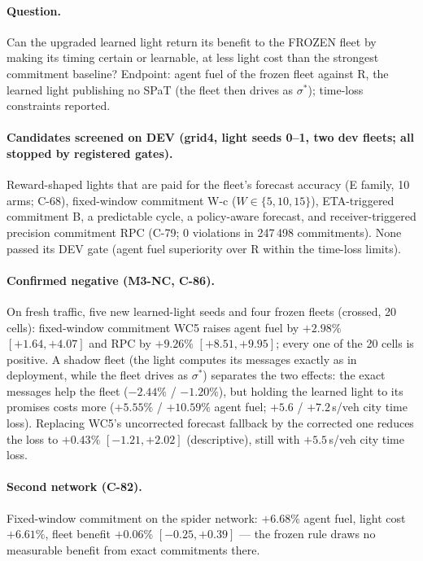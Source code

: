 \documentclass[11pt]{article}
\begin{document}
\paragraph{Question.} Can the upgraded learned light return its benefit to the FROZEN fleet by making its timing certain or learnable, at
less light cost than the strongest commitment baseline? Endpoint: agent fuel of the frozen fleet against R, the learned light publishing no
SPaT (the fleet then drives as $\sigma^*$); time-loss constraints reported.
\paragraph{Candidates screened on DEV (grid4, light seeds 0--1, two dev fleets; all stopped by registered gates).} Reward-shaped lights
that are paid for the fleet's forecast accuracy (E family, 10 arms; C-68), fixed-window commitment W-c ($W\in\{5,10,15\}$), ETA-triggered
commitment B, a predictable cycle, a policy-aware forecast, and receiver-triggered precision commitment RPC (C-79; 0 violations in 247\,498
commitments). None passed its DEV gate (agent fuel superiority over R within the time-loss limits).
\paragraph{Confirmed negative (M3-NC, C-86).} On fresh traffic, five new learned-light seeds and four frozen fleets (crossed, 20 cells):
fixed-window commitment WC5 raises agent fuel by $+2.98\%$ $[+1.64, +4.07]$ and RPC by $+9.26\%$ $[+8.51, +9.95]$; every one of the 20
cells is positive. A shadow fleet (the light computes its messages exactly as in deployment, while the fleet drives as $\sigma^*$) separates
the two effects: the exact messages help the fleet ($-2.44\%$ / $-1.20\%$), but holding the learned light to its promises costs more
($+5.55\%$ / $+10.59\%$ agent fuel; $+5.6$ / $+7.2$\,s/veh city time loss). Replacing WC5's uncorrected forecast fallback by the corrected
one reduces the loss to $+0.43\%$ $[-1.21, +2.02]$ (descriptive), still with $+5.5$\,s/veh city time loss.
\paragraph{Second network (C-82).} Fixed-window commitment on the spider network: $+6.68\%$ agent fuel, light cost $+6.61\%$, fleet benefit
$+0.06\%$ $[-0.25, +0.39]$ --- the frozen rule draws no measurable benefit from exact commitments there.
\end{document}
